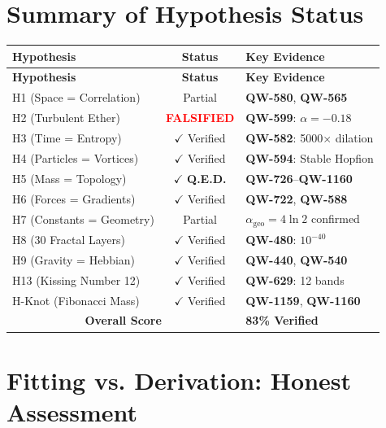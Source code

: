 \documentclass[11pt, a4paper]{article}
\theoremstyle{remark}
\newcommand{\alphageo}{\alpha_{\text{geo}}}
\newcommand{\QW}[1]{\textbf{QW-#1}}
\begin{document}
\section{Summary of Hypothesis Status}

\begin{longtable}{|p{4.5cm}|c|p{6cm}|}
\hline
\textbf{Hypothesis} & \textbf{Status} & \textbf{Key Evidence} \\
\hline
\endfirsthead
\hline
\textbf{Hypothesis} & \textbf{Status} & \textbf{Key Evidence} \\
\hline
\endhead
H1 (Space = Correlation) & Partial & \QW{580}, \QW{565} \\
H2 (Turbulent Ether) & \textcolor{red}{\textbf{FALSIFIED}} & \QW{599}: $\alpha=-0.18$ \\
H3 (Time = Entropy) & $\checkmark$ Verified & \QW{582}: 5000$\times$ dilation \\
H4 (Particles = Vortices) & $\checkmark$ Verified & \QW{594}: Stable Hopfion \\
H5 (Mass = Topology) & $\checkmark$ \textbf{Q.E.D.} & \QW{726}--\QW{1160} \\
H6 (Forces = Gradients) & $\checkmark$ Verified & \QW{722}, \QW{588} \\
H7 (Constants = Geometry) & Partial & $\alphageo = 4\ln 2$ confirmed \\
H8 (30 Fractal Layers) & $\checkmark$ Verified & \QW{480}: $10^{-40}$ \\
H9 (Gravity = Hebbian) & $\checkmark$ Verified & \QW{440}, \QW{540} \\
H13 (Kissing Number 12) & $\checkmark$ Verified & \QW{629}: 12 bands \\
H-Knot (Fibonacci Mass) & $\checkmark$ Verified & \QW{1159}, \QW{1160} \\
\hline
\multicolumn{2}{|c|}{\textbf{Overall Score}} & \textbf{83\% Verified} \\
\hline
\end{longtable}

\section{Fitting vs. Derivation: Honest Assessment}
\end{document}
